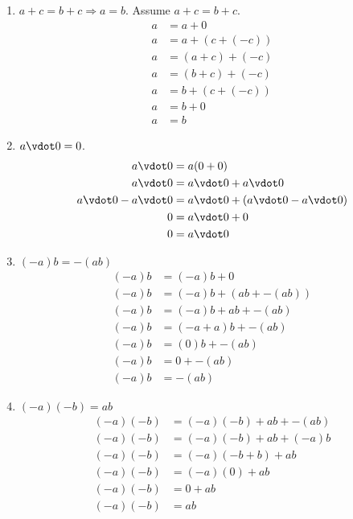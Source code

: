 \documentclass{homework}
\begin{document}
\begin{enumerate}
    \item $a+c = b+c \Rightarrow a=b$. Assume $a+c = b+c$.
        \begin{align*}
            a   &=  a+0	\\
            a   &=	a + (c + (-c))	\\
            a   &=	(a + c) + (-c)	\\
            a   &=	(b + c) + (-c)	\\
            a   &=	b + (c + (-c))	\\
            a   &=	b + 0	\\
            a   &=  b
        \end{align*}
    \item $a \vdot 0 = 0$.
        \begin{align*}
            a \vdot 0	&=	a(0+0)	\\
            a \vdot 0    &=  a \vdot 0 + a \vdot 0   \\
            a \vdot 0 - a \vdot 0 &= a \vdot 0 + (a \vdot 0 - a \vdot 0)  \\
            0   &=  a \vdot 0 + 0   \\
            0   &=  a \vdot 0
        \end{align*}
    \item $(-a) b = -(ab)$
        \begin{align*}
            (-a) b	&=	(-a) b + 0	\\
            (-a) b	&=	(-a) b + (ab + -(ab))	\\
            (-a) b	&=	(-a) b + ab + -(ab)	\\
            (-a) b	&=	(-a + a) b + -(ab)	\\
            (-a) b	&=	(0) b + -(ab)	\\
            (-a) b	&=	0 + -(ab)	\\
            (-a) b	&=	-(ab)
        \end{align*}
    \item $(-a)(-b) = ab$
        \begin{align*}
            (-a)(-b)	&=	(-a)(-b) + ab + -(ab)	\\
            (-a)(-b)	&=	(-a)(-b) + ab + (-a)b	\\
            (-a)(-b)	&=	(-a)(-b + b) + ab	\\
            (-a)(-b)	&=	(-a)(0) + ab	\\
            (-a)(-b)	&=	0 + ab	\\
            (-a)(-b)	&=  ab

\end{align*}
\end{enumerate}
\end{document}
